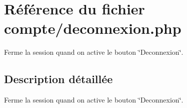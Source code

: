 \hypertarget{deconnexion_8php}{}\section{Référence du fichier compte/deconnexion.php}
\label{deconnexion_8php}


Ferme la session quand on active le bouton \char`\"{}\+Deconnexion\char`\"{}.  




\subsection{Description détaillée}
Ferme la session quand on active le bouton \char`\"{}\+Deconnexion\char`\"{}. 

